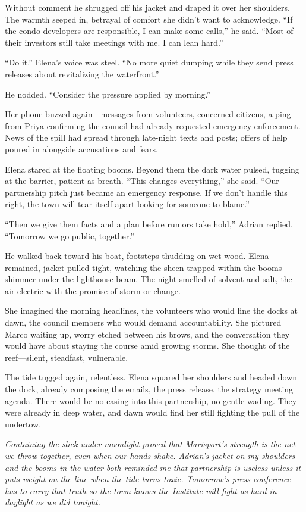 Without comment he shrugged off his jacket and draped it over her shoulders. The warmth seeped in, betrayal of comfort she didn’t want to acknowledge. “If the condo developers are responsible, I can make some calls,” he said. “Most of their investors still take meetings with me. I can lean hard.”

“Do it.” Elena’s voice was steel. “No more quiet dumping while they send press releases about revitalizing the waterfront.”

He nodded. “Consider the pressure applied by morning.”

Her phone buzzed again—messages from volunteers, concerned citizens, a ping from Priya confirming the council had already requested emergency enforcement. News of the spill had spread through late-night texts and posts; offers of help poured in alongside accusations and fears.

Elena stared at the floating booms. Beyond them the dark water pulsed, tugging at the barrier, patient as breath. “This changes everything,” she said. “Our partnership pitch just became an emergency response. If we don’t handle this right, the town will tear itself apart looking for someone to blame.”

“Then we give them facts and a plan before rumors take hold,” Adrian replied. “Tomorrow we go public, together.”

He walked back toward his boat, footsteps thudding on wet wood. Elena remained, jacket pulled tight, watching the sheen trapped within the booms shimmer under the lighthouse beam. The night smelled of solvent and salt, the air electric with the promise of storm or change.

She imagined the morning headlines, the volunteers who would line the docks at dawn, the council members who would demand accountability. She pictured Marco waiting up, worry etched between his brows, and the conversation they would have about staying the course amid growing storms. She thought of the reef—silent, steadfast, vulnerable.

The tide tugged again, relentless. Elena squared her shoulders and headed down the dock, already composing the emails, the press release, the strategy meeting agenda. There would be no easing into this partnership, no gentle wading. They were already in deep water, and dawn would find her still fighting the pull of the undertow.

\noindent\textit{Containing the slick under moonlight proved that Marisport's strength is the net we throw together, even when our hands shake. Adrian's jacket on my shoulders and the booms in the water both reminded me that partnership is useless unless it puts weight on the line when the tide turns toxic. Tomorrow's press conference has to carry that truth so the town knows the Institute will fight as hard in daylight as we did tonight.}
